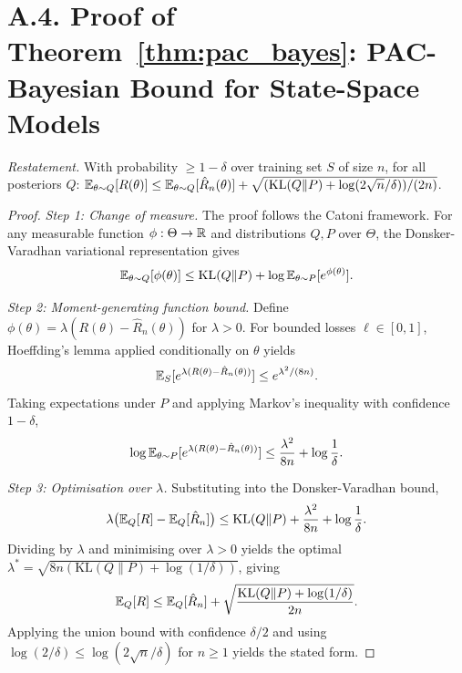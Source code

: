 \section*{A.4. Proof of Theorem~\ref{thm:pac_bayes}: PAC-Bayesian Bound for State-Space Models}
\label{app:proof_pac}

\noindent\textit{Restatement.} With probability $\ge 1-\delta$ over training set $S$ of size $n$, for all posteriors $Q$: $\mathbb{E}_{\theta\sim Q}[R(\theta)]\le\mathbb{E}_{\theta\sim Q}[\hat{R}_n(\theta)] + \sqrt{(\mathrm{KL}(Q\|P)+\log(2\sqrt{n}/\delta))/(2n)}$.

\begin{proof}
\textit{Step 1: Change of measure.} The proof follows the Catoni framework. For any measurable function $\phi:\Theta\to\mathbb{R}$ and distributions $Q,P$ over $\Theta$, the Donsker-Varadhan variational representation gives
\begin{equation}
\mathbb{E}_{\theta\sim Q}[\phi(\theta)] \le \mathrm{KL}(Q\|P) + \log\mathbb{E}_{\theta\sim P}[e^{\phi(\theta)}].
\end{equation}

\textit{Step 2: Moment-generating function bound.} Define $\phi(\theta) = \lambda(R(\theta)-\hat{R}_n(\theta))$ for $\lambda>0$. For bounded losses $\ell\in[0,1]$, Hoeffding's lemma applied conditionally on $\theta$ yields
\begin{equation}
\mathbb{E}_S[e^{\lambda(R(\theta)-\hat{R}_n(\theta))}] \le e^{\lambda^2/(8n)}.
\end{equation}
Taking expectations under $P$ and applying Markov's inequality with confidence $1-\delta$,
\begin{equation}
\log\mathbb{E}_{\theta\sim P}[e^{\lambda(R(\theta)-\hat{R}_n(\theta))}] \le \frac{\lambda^2}{8n} + \log\frac{1}{\delta}.
\end{equation}

\textit{Step 3: Optimisation over $\lambda$.} Substituting into the Donsker-Varadhan bound,
\begin{equation}
\lambda\bigl(\mathbb{E}_Q[R]-\mathbb{E}_Q[\hat{R}_n]\bigr) \le \mathrm{KL}(Q\|P) + \frac{\lambda^2}{8n} + \log\frac{1}{\delta}.
\end{equation}
Dividing by $\lambda$ and minimising over $\lambda>0$ yields the optimal $\lambda^* = \sqrt{8n(\mathrm{KL}(Q\|P)+\log(1/\delta))}$, giving
\begin{equation}
\mathbb{E}_Q[R] \le \mathbb{E}_Q[\hat{R}_n] + \sqrt{\frac{\mathrm{KL}(Q\|P)+\log(1/\delta)}{2n}}.
\end{equation}
Applying the union bound with confidence $\delta/2$ and using $\log(2/\delta)\le\log(2\sqrt{n}/\delta)$ for $n\ge 1$ yields the stated form.


\end{proof}
